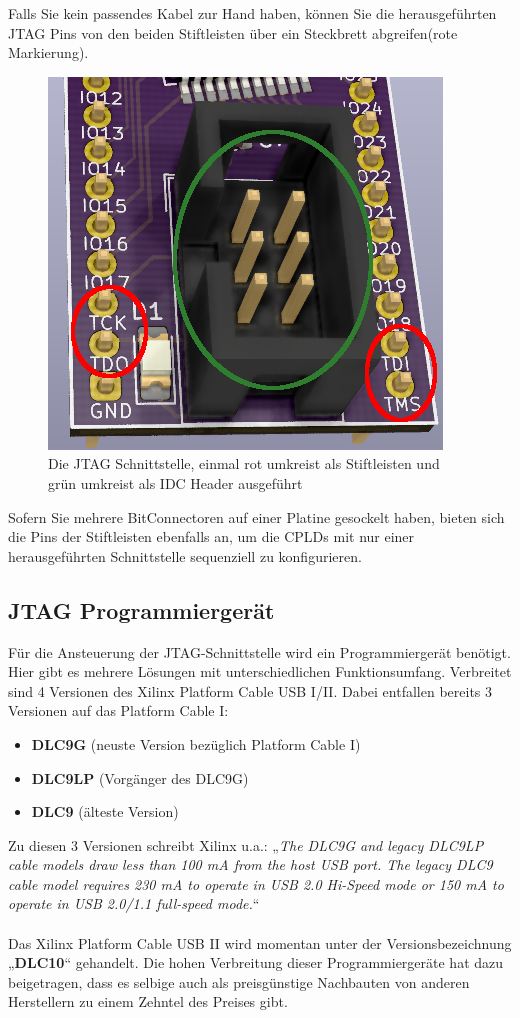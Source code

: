 \documentclass{article}
\begin{document}
\vspace{0.5cm}

\newpage

Falls Sie kein passendes Kabel zur Hand haben, können Sie die herausgeführten JTAG Pins von den beiden Stiftleisten über ein Steckbrett abgreifen(rote Markierung).

\begin{figure}[!h]
	\centering
	\includegraphics[width=0.4\linewidth]{Figures/JTAG_Pins}
	\caption{Die JTAG Schnittstelle, einmal rot umkreist als Stiftleisten und grün umkreist als IDC Header ausgeführt}
	\label{fig:JTAG_Pins}
\end{figure}

Sofern Sie mehrere BitConnectoren auf einer Platine gesockelt haben, bieten sich die Pins der Stiftleisten ebenfalls an, um die CPLDs mit nur einer herausgeführten Schnittstelle sequenziell zu konfigurieren.
\subsection{JTAG Programmiergerät}
Für die Ansteuerung der JTAG-Schnittstelle wird ein Programmiergerät benötigt. 
Hier gibt es mehrere Lösungen mit unterschiedlichen Funktionsumfang. Verbreitet sind 4 Versionen des Xilinx Platform Cable USB I/II. Dabei entfallen bereits 3 Versionen auf das Platform Cable I: 
\begin{itemize}
	\item \textbf{DLC9G} (neuste Version bezüglich Platform Cable I)
	\item \textbf{DLC9LP} (Vorgänger des DLC9G)
	\item \textbf{DLC9} (älteste Version)
\end{itemize}

\newpage

Zu diesen 3 Versionen schreibt Xilinx u.a.: „\textit{The DLC9G and legacy DLC9LP cable models draw less than 100 mA from the host USB port. The legacy DLC9 cable model requires 230 mA to operate in USB 2.0 Hi-Speed mode or 150 mA to operate in USB 2.0/1.1 full-speed mode.}“ \autocite[2]{Platform_Cable}\\\\
Das Xilinx Platform Cable USB II wird momentan unter der Versionsbezeichnung „\textbf{DLC10}“ gehandelt.
Die hohen Verbreitung dieser Programmiergeräte hat dazu beigetragen, dass es selbige auch als preisgünstige Nachbauten von anderen Herstellern zu einem Zehntel des Preises gibt.
\end{document}
